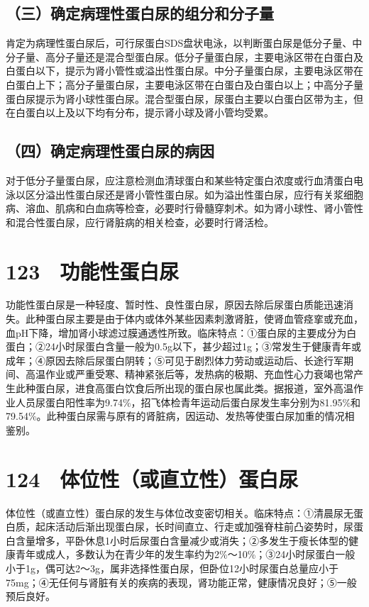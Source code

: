 \subsection{（三）确定病理性蛋白尿的组分和分子量}

肯定为病理性蛋白尿后，可行尿蛋白SDS盘状电泳，以判断蛋白尿是低分子量、中分子量、高分子量还是混合型蛋白尿。低分子量蛋白尿，主要电泳区带在白蛋白及白蛋白以下，提示为肾小管性或溢出性蛋白尿。中分子量蛋白尿，主要电泳区带在白蛋白上下；高分子量蛋白尿，主要电泳区带在白蛋白及白蛋白以上；中高分子量蛋白尿提示为肾小球性蛋白尿。混合型蛋白尿，尿蛋白主要以白蛋白区带为主，但在白蛋白以上及以下均有分布，提示肾小球及肾小管均受累。

\subsection{（四）确定病理性蛋白尿的病因}

对于低分子量蛋白尿，应注意检测血清球蛋白和某些特定蛋白浓度或行血清蛋白电泳以区分溢出性蛋白尿还是肾小管性蛋白尿。如为溢出性蛋白尿，应行有关浆细胞病、溶血、肌病和白血病等检查，必要时行骨髓穿刺术。如为肾小球性、肾小管性和混合性蛋白尿，应行肾脏病的相关检查，必要时行肾活检。

\protect\hypertarget{text00289.html}{}{}

\section{123　功能性蛋白尿}

功能性蛋白尿是一种轻度、暂时性、良性蛋白尿，原因去除后尿蛋白质能迅速消失。此种蛋白尿主要是由于体内或体外某些因素刺激肾脏，使肾血管痉挛或充血，血pH下降，增加肾小球滤过膜通透性所致。临床特点：①蛋白尿的主要成分为白蛋白；②24小时尿蛋白含量一般为0.5g以下，甚少超过1g；③常发生于健康青年或成年；④原因去除后尿蛋白阴转；⑤可见于剧烈体力劳动或运动后、长途行军期间、高温作业或严重受寒、精神紧张后等，发热病的极期、充血性心力衰竭也常产生此种蛋白尿，进食高蛋白饮食后所出现的蛋白尿也属此类。据报道，室外高温作业人员尿蛋白阳性率为9.74\%，招飞体检青年运动后蛋白尿发生率分别为81.95\%和79.54\%。此种蛋白尿需与原有的肾脏病，因运动、发热等使蛋白尿加重的情况相鉴别。

\protect\hypertarget{text00290.html}{}{}

\section{124　体位性（或直立性）蛋白尿}

体位性（或直立性）蛋白尿的发生与体位改变密切相关。临床特点：①清晨尿无蛋白质，起床活动后渐出现蛋白尿，长时间直立、行走或加强脊柱前凸姿势时，尿蛋白含量增多，平卧休息1小时后尿蛋白含量减少或消失；②多发生于瘦长体型的健康青年或成人，多数认为在青少年的发生率约为2\%～10\%；③24小时尿蛋白一般小于1g，偶可达2～3g，属非选择性蛋白尿，但卧位12小时尿蛋白总量应小于75mg；④无任何与肾脏有关的疾病的表现，肾功能正常，健康情况良好；⑤一般预后良好。

